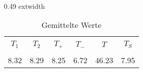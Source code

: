 \begin{table}{0.49	extwidth} 
 \centering 
 \begin{tabular}{S S S S S S } 
 \toprule \\ 
$T_{1}$  & $T_{2}$  & $T_{+}$  & $T_{-}$  & $T$  & $T_{S}$ \\ 
\midrule \\ 
 8.32   & 8.29   & 8.25   & 6.72   & 46.23   & 7.95 \\ 
 \bottomrule 
 \end{tabular} 
 \caption{Gemittelte Werte} 
 \label{tab:mids_T} 
  \end{table}